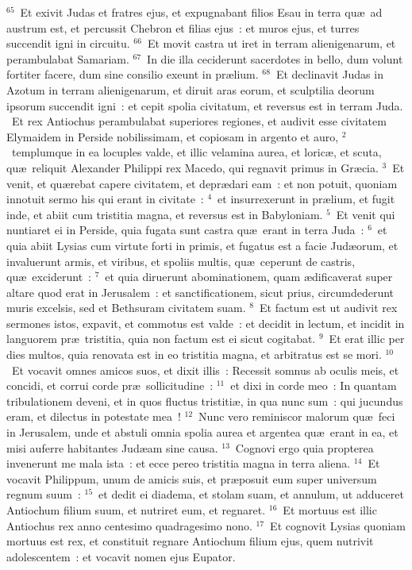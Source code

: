 ${}^{65}$~Et exivit Judas et fratres ejus, et expugnabant filios Esau in terra qu\ae\ ad austrum est, et percussit Chebron et filias ejus~: et muros ejus, et turres succendit igni in circuitu.
${}^{66}$~Et movit castra ut iret in terram alienigenarum, et perambulabat Samariam.
${}^{67}$~In die illa ceciderunt sacerdotes in bello, dum volunt fortiter facere, dum sine consilio exeunt in pr\ae lium.
${}^{68}$~Et declinavit Judas in Azotum in terram alienigenarum, et diruit aras eorum, et sculptilia deorum ipsorum succendit igni~: et cepit spolia civitatum, et reversus est in terram Juda.
~\lettrine[lines=10,image=true,loversize=0.05,lraise=-0.03]{E}{}t rex Antiochus perambulabat superiores regiones, et audivit esse civitatem Elymaidem in Perside nobilissimam, et copiosam in argento et auro,
${}^{2}$~templumque in ea locuples valde, et illic velamina aurea, et loric\ae , et scuta, qu\ae\ reliquit Alexander Philippi rex Macedo, qui regnavit primus in Gr\ae cia.
${}^{3}$~Et venit, et qu\ae rebat capere civitatem, et depr\ae dari eam~: et non potuit, quoniam innotuit sermo his qui erant in civitate~:
${}^{4}$~et insurrexerunt in pr\ae lium, et fugit inde, et abiit cum tristitia magna, et reversus est in Babyloniam.
${}^{5}$~Et venit qui nuntiaret ei in Perside, quia fugata sunt castra qu\ae\ erant in terra Juda~:
${}^{6}$~et quia abiit Lysias cum virtute forti in primis, et fugatus est a facie Jud\ae orum, et invaluerunt armis, et viribus, et spoliis multis, qu\ae\ ceperunt de castris, qu\ae\ exciderunt~:
${}^{7}$~et quia diruerunt abominationem, quam \ae dificaverat super altare quod erat in Jerusalem~: et sanctificationem, sicut prius, circumdederunt muris excelsis, sed et Bethsuram civitatem suam.
${}^{8}$~Et factum est ut audivit rex sermones istos, expavit, et commotus est valde~: et decidit in lectum, et incidit in languorem pr\ae\ tristitia, quia non factum est ei sicut cogitabat.
${}^{9}$~Et erat illic per dies multos, quia renovata est in eo tristitia magna, et arbitratus est se mori.
${}^{10}$~Et vocavit omnes amicos suos, et dixit illis~: Recessit somnus ab oculis meis, et concidi, et corrui corde pr\ae\ sollicitudine~:
${}^{11}$~et dixi in corde meo~: In quantam tribulationem deveni, et in quos fluctus tristiti\ae , in qua nunc sum~: qui jucundus eram, et dilectus in potestate mea~!
${}^{12}$~Nunc vero reminiscor malorum qu\ae\ feci in Jerusalem, unde et abstuli omnia spolia aurea et argentea qu\ae\ erant in ea, et misi auferre habitantes Jud\ae am sine causa.
${}^{13}$~Cognovi ergo quia propterea invenerunt me mala ista~: et ecce pereo tristitia magna in terra aliena.
${}^{14}$~Et vocavit Philippum, unum de amicis suis, et pr\ae posuit eum super universum regnum suum~:
${}^{15}$~et dedit ei diadema, et stolam suam, et annulum, ut adduceret Antiochum filium suum, et nutriret eum, et regnaret.
${}^{16}$~Et mortuus est illic Antiochus rex anno centesimo quadragesimo nono.
${}^{17}$~Et cognovit Lysias quoniam mortuus est rex, et constituit regnare Antiochum filium ejus, quem nutrivit adolescentem~: et vocavit nomen ejus Eupator.



